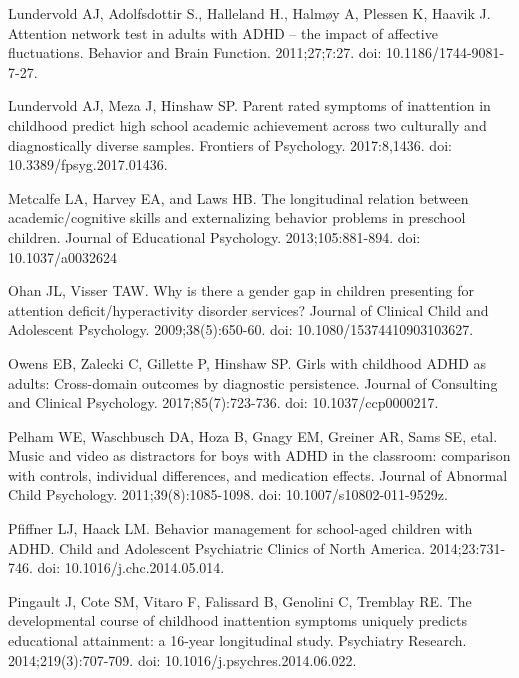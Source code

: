 \documentclass[10pt,letterpaper]{article}
\begin{document}
{{\begin{thebibliography}{10}
Lundervold AJ, Adolfsdottir S., Halleland H., Halm\o{}y A, 
  Plessen K, Haavik J.
\newblock Attention network test in adults with ADHD -- the impact of affective
  fluctuations.
\newblock Behavior and Brain Function. 2011;27;7:27.  doi: 10.1186/1744-9081-7-27.

Lundervold  AJ, Meza J, Hinshaw SP.
\newblock Parent rated symptoms of inattention in childhood predict high school academic achievement across two culturally and diagnostically diverse samples.
\newblock Frontiers of Psychology. 2017:8,1436. doi: 10.3389/fpsyg.2017.01436.

Metcalfe LA, Harvey EA, and Laws HB.
\newblock The longitudinal relation between academic/cognitive skills and
  externalizing behavior problems in preschool children.
\newblock Journal of Educational Psychology. 2013;105:881-894. doi: 10.1037/a0032624

Ohan JL, Visser TAW.
\newblock Why is there a gender gap in children presenting for attention
  deficit/hyperactivity disorder services?
\newblock Journal of Clinical Child and Adolescent Psychology. 2009;38(5):650-60. doi: 10.1080/15374410903103627.
 

Owens EB, Zalecki C, Gillette P, Hinshaw SP.
\newblock Girls with childhood ADHD as adults: Cross-domain outcomes by
  diagnostic persistence.
\newblock Journal of Consulting and Clinical Psychology. 2017;85(7):723-736. doi: 10.1037/ccp0000217.

Pelham WE, Waschbusch DA, Hoza B, Gnagy EM,
  Greiner AR, Sams SE, etal. 
  \newblock Music and video as distractors for boys with {ADHD} in the classroom:
  comparison with controls, individual differences, and medication effects.
\newblock Journal of Abnormal Child Psychology. 2011;39(8):1085-1098. doi: 10.1007/s10802-011-9529\-z.

Pfiffner LJ, Haack LM.
\newblock Behavior management for school-aged children with {ADHD}.
\newblock Child and Adolescent Psychiatric Clinics of North America. 2014;23:731-746. doi: 10.1016/j.chc.2014.05.014.

Pingault J, Cote SM, Vitaro F, Falissard B,
Genolini C, Tremblay RE.
\newblock The developmental course of childhood inattention symptoms uniquely
  predicts educational attainment: a 16-year longitudinal study.
\newblock Psychiatry Research. 2014;219(3):707-709. doi: 10.1016/j.psychres.2014.06.022.


\end{thebibliography}}}
\end{document}
